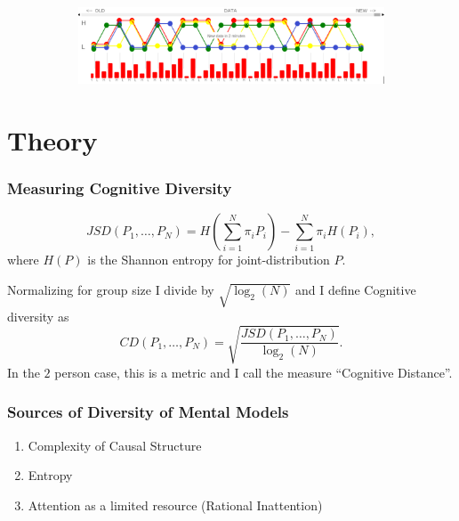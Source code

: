 \documentclass{beamer}
\begin{document}
\begin{frame}
\begin{figure}
\begin{subfigure}{0.45\textwidth}
         \includegraphics[width=\textwidth]{ComplexData.pdf}
        \end{subfigure}%
     
\end{figure}
\end{frame}
\section{Theory}
\begin{frame}
\frametitle{Measuring Cognitive Diversity}
\begin{definition}
\begin{equation}
JSD(P_1, \ldots, P_N)= H\left(\sum_{i=1}^N\pi_iP_i\right)-\sum_{i=1}^N\pi_iH(P_i),
\end{equation}
\small
where $H(P)$ is the Shannon entropy for joint-distribution $P$. 
\end{definition} 
\begin{definition}
Normalizing for group size I divide by $\sqrt{\log_2(N)}$ and I define Cognitive diversity as 
\begin{equation}
CD(P_1, \ldots, P_N)=\sqrt{\frac{JSD(P_1, \ldots, P_N)}{\log_2(N)}}.
\end{equation}
In the $2$ person case, this is a metric and I call the measure ``Cognitive Distance''. 
\end{definition} 
\normalsize 
\end{frame}

\begin{frame}
\frametitle{Sources of Diversity of Mental Models}
\begin{enumerate}
\item Complexity of Causal Structure
\item Entropy 
\item Attention as a limited resource (Rational Inattention)
\end{enumerate}
\end{frame}
\end{document}
